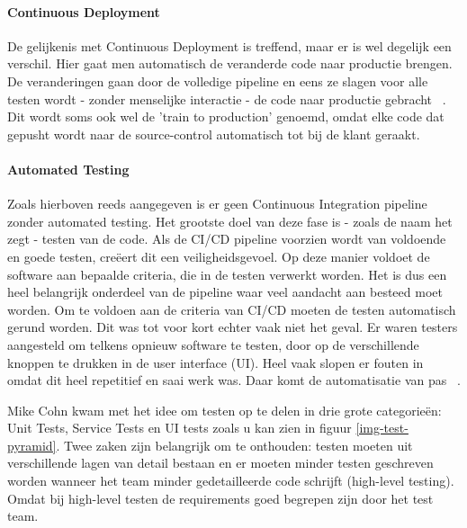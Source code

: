         \paragraph{Continuous Deployment}
        De gelijkenis met Continuous Deployment is treffend, maar er is wel degelijk een verschil.
        Hier gaat men automatisch de veranderde code naar productie brengen. De veranderingen gaan door de volledige pipeline en eens ze slagen voor alle testen wordt - zonder menselijke interactie - de code naar productie gebracht ~\autocite{Claps2015}.
        Dit wordt soms ook wel de 'train to production' genoemd, omdat elke code dat gepusht wordt naar de source-control automatisch tot bij de klant geraakt.
        
        \paragraph{Automated Testing}
        Zoals hierboven reeds aangegeven is er geen Continuous Integration pipeline zonder automated testing. Het grootste doel van deze fase is - zoals de naam het zegt - testen van de code. Als de CI/CD pipeline voorzien wordt van voldoende en goede testen, creëert dit een veiligheidsgevoel. Op deze manier voldoet de software aan bepaalde criteria, die in de testen verwerkt worden. Het is dus een heel belangrijk onderdeel van de pipeline waar veel aandacht aan besteed moet worden. 
        Om te voldoen aan de criteria van CI/CD moeten de testen automatisch gerund worden. Dit was tot voor kort echter vaak niet het geval. Er waren testers aangesteld om telkens opnieuw software te testen, door op de verschillende knoppen te drukken in de user interface (UI). Heel vaak slopen er fouten in omdat dit heel repetitief en saai werk was. Daar komt de automatisatie van pas ~\autocite{Vocke2018}.
        
        Mike Cohn kwam met het idee om testen op te delen in drie grote categorieën: Unit Tests, Service Tests en UI tests zoals u kan zien in figuur \ref{img-test-pyramid}.
        Twee zaken zijn belangrijk om te onthouden: testen moeten uit verschillende lagen van detail bestaan en er moeten minder testen geschreven worden wanneer het team minder gedetailleerde code schrijft (high-level testing). Omdat bij high-level testen de requirements goed begrepen zijn door het test team.
        
